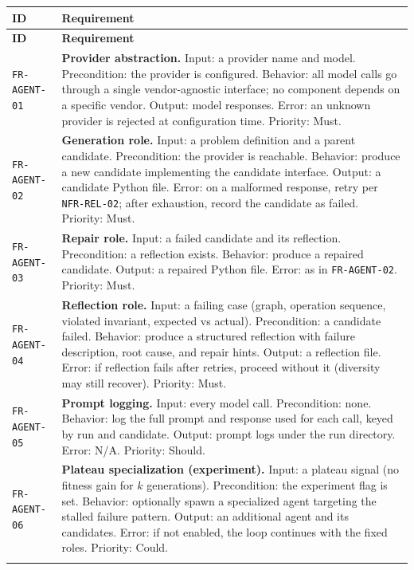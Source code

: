\documentclass[12pt,a4paper]{article}
\begin{document}
\begin{longtable}{@{}p{2.2cm}p{10.6cm}@{}}
\toprule
\textbf{ID} & \textbf{Requirement} \\
\midrule
\endfirsthead
\toprule
\textbf{ID} & \textbf{Requirement} \\
\midrule
\endhead
\bottomrule
\endfoot

\texttt{FR-AGENT-01} & \textbf{Provider abstraction.} Input: a provider name and model. Precondition: the provider is configured. Behavior: all model calls go through a single vendor-agnostic interface; no component depends on a specific vendor. Output: model responses. Error: an unknown provider is rejected at configuration time. Priority: Must. \\
\addlinespace[2pt]

\texttt{FR-AGENT-02} & \textbf{Generation role.} Input: a problem definition and a parent candidate. Precondition: the provider is reachable. Behavior: produce a new candidate implementing the candidate interface. Output: a candidate Python file. Error: on a malformed response, retry per \texttt{NFR-REL-02}; after exhaustion, record the candidate as failed. Priority: Must. \\
\addlinespace[2pt]

\texttt{FR-AGENT-03} & \textbf{Repair role.} Input: a failed candidate and its reflection. Precondition: a reflection exists. Behavior: produce a repaired candidate. Output: a repaired Python file. Error: as in \texttt{FR-AGENT-02}. Priority: Must. \\
\addlinespace[2pt]

\texttt{FR-AGENT-04} & \textbf{Reflection role.} Input: a failing case (graph, operation sequence, violated invariant, expected vs actual). Precondition: a candidate failed. Behavior: produce a structured reflection with failure description, root cause, and repair hints. Output: a reflection file. Error: if reflection fails after retries, proceed without it (diversity may still recover). Priority: Must. \\
\addlinespace[2pt]

\texttt{FR-AGENT-05} & \textbf{Prompt logging.} Input: every model call. Precondition: none. Behavior: log the full prompt and response used for each call, keyed by run and candidate. Output: prompt logs under the run directory. Error: N/A. Priority: Should. \\
\addlinespace[2pt]

\texttt{FR-AGENT-06} & \textbf{Plateau specialization (experiment).} Input: a plateau signal (no fitness gain for $k$ generations). Precondition: the experiment flag is set. Behavior: optionally spawn a specialized agent targeting the stalled failure pattern. Output: an additional agent and its candidates. Error: if not enabled, the loop continues with the fixed roles. Priority: Could. \\
\addlinespace[2pt]


\end{longtable}
\end{document}
